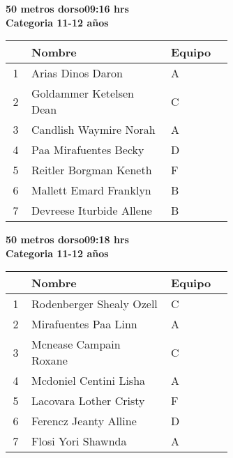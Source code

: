 \begin{minipage}{0.95\linewidth}\vspace{0.5cm} 
\begin{flushleft}
\textbf{
\hspace{-0.15cm}50 metros dorso\hspace{1.5cm}09:16 hrs \\Categoria 11-12 años}\vspace{-0.2cm} 
\end{flushleft}
\begin{tabular}{cp{0.63\linewidth}l}
\hline
& \textbf{Nombre} & \textbf{Equipo} \\ \hline
1 & Arias Dinos Daron & A \\ 
2 & Goldammer Ketelsen Dean & C \\ 
3 & Candlish Waymire Norah & A \\ 
4 & Paa Mirafuentes Becky & D \\ 
5 & Reitler Borgman Keneth & F \\ 
6 & Mallett Emard Franklyn & B \\ 
7 & Devreese Iturbide Allene & B \\ 
\end{tabular}
\end{minipage}
\begin{minipage}{0.95\linewidth}\vspace{0.5cm} 
\begin{flushleft}
\textbf{
\hspace{-0.15cm}50 metros dorso\hspace{1.5cm}09:18 hrs \\Categoria 11-12 años}\vspace{-0.2cm} 
\end{flushleft}
\begin{tabular}{cp{0.63\linewidth}l}
\hline
& \textbf{Nombre} & \textbf{Equipo} \\ \hline
1 & Rodenberger Shealy Ozell & C \\ 
2 & Mirafuentes Paa Linn & A \\ 
3 & Mcnease Campain Roxane & C \\ 
4 & Mcdoniel Centini Lisha & A \\ 
5 & Lacovara Lother Cristy & F \\ 
6 & Ferencz Jeanty Alline & D \\ 
7 & Flosi Yori Shawnda & A \\ 
\end{tabular}
\end{minipage}
